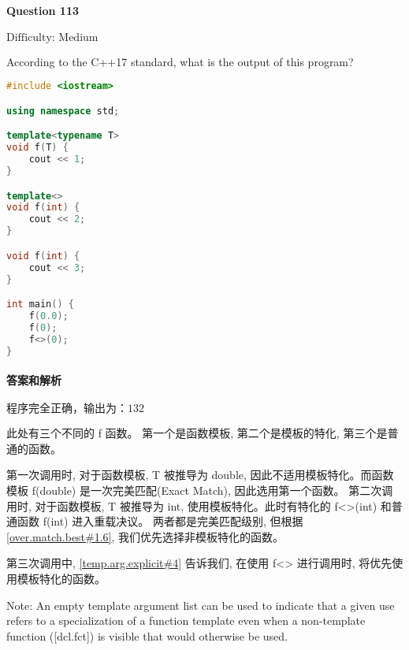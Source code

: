 \documentclass{article}
\begin{document}
	
	\paragraph*{Question 113} $\boxed{\text{Difficulty: Medium}} $			
	
	According to the C++17 standard, what is the output of this program?
	
	\begin{lstlisting}[language=C++]  		
#include <iostream>

using namespace std;

template<typename T>
void f(T) {
	cout << 1;
}

template<>
void f(int) {
	cout << 2;
}

void f(int) {
	cout << 3;
}

int main() {
	f(0.0);
	f(0);
	f<>(0);
}
	\end{lstlisting}
	
	
	\paragraph*{答案和解析} $\boxed{\text{程序完全正确，输出为：132}} $
	
	此处有三个不同的 f 函数。 第一个是函数模板, 第二个是模板的特化, 第三个是普通的函数。

	第一次调用时, 对于函数模板, T 被推导为 double, 因此不适用模板特化。而函数模板 f(double) 是一次完美匹配(Exact Match), 因此选用第一个函数。
	第二次调用时, 对于函数模板, T 被推导为 int, 使用模板特化。此时有特化的 f<>(int) 和普通函数 f(int) 进入重载决议。 两者都是完美匹配级别, 但根据 \href{https://timsong-cpp.github.io/cppwp/n4659/over.match.best#1.6}{[over.match.best\#1.6]}, 我们优先选择非模板特化的函数。
	
	第三次调用中, \href{https://timsong-cpp.github.io/cppwp/n4659/temp.arg.explicit#4}{[temp.arg.explicit\#4]} 告诉我们, 在使用 f<> 进行调用时, 将优先使用模板特化的函数。
	\begin{lightgrayleftbar}
		Note: An empty template argument list can be used to indicate that a given use refers to a specialization of a function template even when a non-template function ([dcl.fct]) is visible that would otherwise be used.
	\end{lightgrayleftbar}
\end{document}
